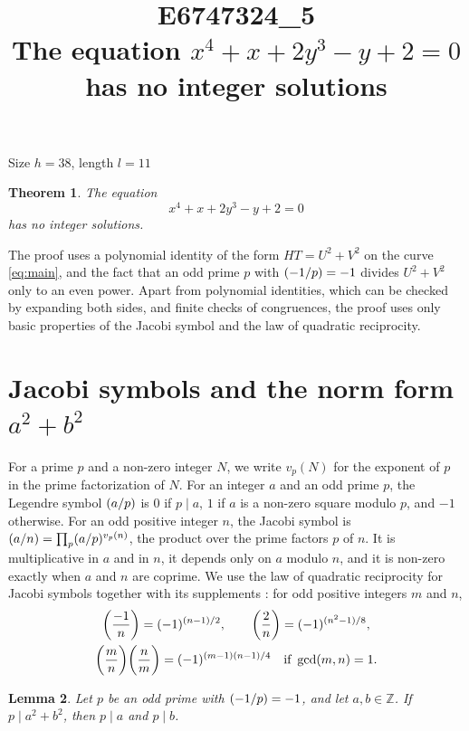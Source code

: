 \documentclass[11pt]{article}
\title{\textbf{E6747324\_5}\\[4pt] {\Large The equation $x^{4}+x+2y^{3}-y+2=0$ has no integer solutions}}
\author{}
\date{}
\newtheorem{theorem}{Theorem}
\newtheorem{lemma}[theorem]{Lemma}
\newcommand{\Z}{\mathbb{Z}}
\newcommand{\leg}[2]{\mathchoice{\biggl(\dfrac{#1}{#2}\biggr)}{(#1/#2)}{(#1/#2)}{(#1/#2)}}
\begin{document}
\maketitle
\vspace{-8ex}
\begin{center}
Size $h=38$, length $l=11$
\end{center}

\begin{theorem}\label{thm:main}
The equation
\begin{equation}\label{eq:main}
x^{4}+x+2y^{3}-y+2=0
\end{equation}
has no integer solutions.
\end{theorem}

The proof uses a polynomial identity of the form $HT=U^2+V^2$ on the curve \eqref{eq:main}, and the fact that an odd prime $p$ with $\leg{-1}{p}=-1$ divides $U^2+V^2$ only to an even power. Apart from polynomial identities, which can be checked by expanding both sides, and finite checks of congruences, the proof uses only basic properties of the Jacobi symbol and the law of quadratic reciprocity.

\section{\texorpdfstring{Jacobi symbols and the norm form $a^2+b^2$}{Jacobi symbols and the norm form}}

For a prime $p$ and a non-zero integer $N$, we write $v_p(N)$ for the exponent of $p$ in the prime factorization of $N$. For an integer $a$ and an odd prime $p$, the Legendre symbol $\leg{a}{p}$ is $0$ if $p\mid a$, $1$ if $a$ is a non-zero square modulo $p$, and $-1$ otherwise. For an odd positive integer $n$, the Jacobi symbol is $\leg{a}{n}=\prod_p\leg{a}{p}^{v_p(n)}$, the product over the prime factors $p$ of $n$. It is multiplicative in $a$ and in $n$, it depends only on $a$ modulo $n$, and it is non-zero exactly when $a$ and $n$ are coprime. We use the law of quadratic reciprocity for Jacobi symbols together with its supplements \cite[Chapter~5, \S2]{IR}: for odd positive integers $m$ and $n$,
\begin{gather*}
\leg{-1}{n}=(-1)^{(n-1)/2},\qquad\leg{2}{n}=(-1)^{(n^2-1)/8},\\
\leg{m}{n}\leg{n}{m}=(-1)^{(m-1)(n-1)/4}\quad\text{if }\gcd(m,n)=1.
\end{gather*}

\begin{lemma}\label{lem:divides}
Let $p$ be an odd prime with $\leg{-1}{p}=-1$, and let $a,b\in\Z$. If $p\mid a^2+b^2$, then $p\mid a$ and $p\mid b$.
\end{lemma}
\end{document}
